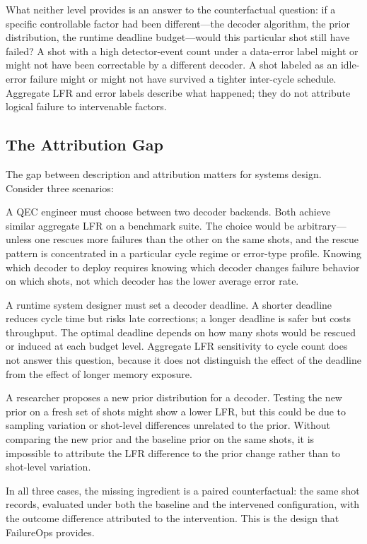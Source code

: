 What neither level provides is an answer to the counterfactual question: if a specific controllable factor had been different---the decoder algorithm, the prior distribution, the runtime deadline budget---would this particular shot still have failed? A shot with a high detector-event count under a data-error label might or might not have been correctable by a different decoder. A shot labeled as an idle-error failure might or might not have survived a tighter inter-cycle schedule. Aggregate LFR and error labels describe what happened; they do not attribute logical failure to intervenable factors.

\subsection{The Attribution Gap}

The gap between description and attribution matters for systems design. Consider three scenarios:

A QEC engineer must choose between two decoder backends. Both achieve similar aggregate LFR on a benchmark suite. The choice would be arbitrary---unless one rescues more failures than the other on the same shots, and the rescue pattern is concentrated in a particular cycle regime or error-type profile. Knowing which decoder to deploy requires knowing which decoder changes failure behavior on which shots, not which decoder has the lower average error rate.

A runtime system designer must set a decoder deadline. A shorter deadline reduces cycle time but risks late corrections; a longer deadline is safer but costs throughput. The optimal deadline depends on how many shots would be rescued or induced at each budget level. Aggregate LFR sensitivity to cycle count does not answer this question, because it does not distinguish the effect of the deadline from the effect of longer memory exposure.

A researcher proposes a new prior distribution for a decoder. Testing the new prior on a fresh set of shots might show a lower LFR, but this could be due to sampling variation or shot-level differences unrelated to the prior. Without comparing the new prior and the baseline prior on the same shots, it is impossible to attribute the LFR difference to the prior change rather than to shot-level variation.

In all three cases, the missing ingredient is a paired counterfactual: the same shot records, evaluated under both the baseline and the intervened configuration, with the outcome difference attributed to the intervention. This is the design that FailureOps provides.
